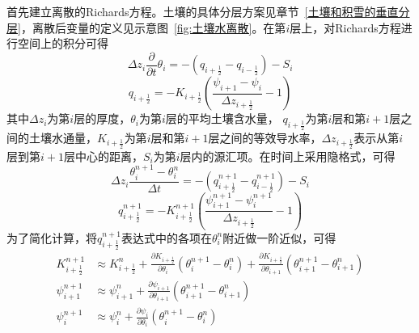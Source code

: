 首先建立离散的Richards方程。土壤的具体分层方案见章节~\ref{土壤和积雪的垂直分层}，离散后变量的定义见示意图~\ref{fig:土壤水离散}。在第$i$层上，对Richards方程进行空间上的积分可得
\begin{equation}
\Delta z_{i} \frac{\partial}{\partial t} \theta_{i}=-\left(q_{i+\frac{1}{2}}-q_{i-\frac{1}{2}}\right)-S_{i}
\end{equation}
\begin{equation}
q_{i+\frac{1}{2}}=-K_{i+\frac{1}{2}}\left(\frac{\psi_{i+1}-\psi_{i}}{\Delta z_{i+\frac{1}{2}}}-1\right)
\end{equation}
其中$\Delta {z_i}$为第$i$层的厚度，$\theta_i$为第$i$层的平均土壤含水量，
$q_{i+\frac{1}{2}}$为第$i$层和第$i+1$层之间的土壤水通量，$K_{i+\frac{1}{2}}$为第$i$层和第$i+1$层之间的等效导水率，$\Delta z_{i+\frac{1}{2}}$表示从第$i$层到第$i+1$层中心的距离，$S_i$为第$i$层内的源汇项。在时间上采用隐格式，可得
\begin{equation}
\Delta z_{i} \frac{\theta_{i}^{n+1}-\theta_{i}^{n}}{\Delta t}=-\left(q_{i+\frac{1}{2}}^{n+1}-q_{i-\frac{1}{2}}^{n+1}\right)-S_{i}
\end{equation}
\begin{equation}
q_{i+\frac{1}{2}}^{n+1}=-K_{i+\frac{1}{2}}^{n+1}\left(\frac{\psi_{i+1}^{n+1}-\psi_{i}^{n+1}}{\Delta z_{i+\frac{1}{2}}}-1\right)
\end{equation}
为了简化计算，将$q_{i+\frac{1}{2}}^{n+1}$表达式中的各项在$\theta_i^n$附近做一阶近似，可得
\begin{equation}
\begin{aligned}
K_{i+\frac{1}{2}}^{n+1} &\approx K_{i+\frac{1}{2}}^{n}+\frac{\partial K_{i+\frac{1}{2}}}
    {\partial \theta_{i}}\left(\theta_{i}^{n+1}-\theta_{i}^{n}\right)+\frac{\partial K_{i+\frac{1}{2}}}
    {\partial \theta_{i+1}}\left(\theta_{i+1}^{n+1}-\theta_{i+1}^{n}\right) \\ 
\psi_{i+1}^{n+1} &\approx \psi_{i+1}^{n}+\frac{\partial \psi_{i+1}}{\partial \theta_{i+1}}\left(\theta_{i+1}^{n+1}-\theta_{i+1}^{n}\right) \\
\psi_{i}^{n+1} &\approx \psi_{i}^{n}+\frac{\partial \psi_{i}}{\partial \theta_{i}}\left(\theta_{i}^{n+1}-\theta_{i}^{n}\right)
\end{aligned}
\end{equation}

